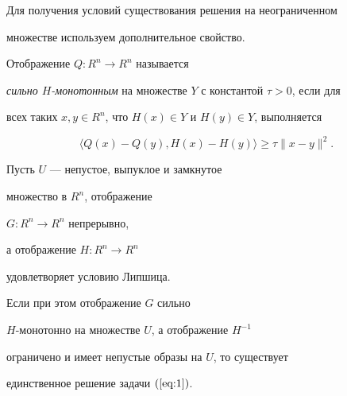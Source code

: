Для получения условий существования решения на неограниченном 


множестве используем дополнительное свойство. 





\begin{defn}


Отображение $Q: R^{n} \rightarrow R^{n}$ называется


{\it сильно $H$-монотонным} на множестве $Y$ с константой $\tau > 0$, если для


всех таких $x,y \in R^{n}$, что $H(x) \in Y$ и $H(y) \in Y$, выполняется


$$


\langle Q(x) - Q(y), H(x) - H(y) \rangle \geq \tau \| x-y \|^{2}.


$$


\end{defn}





 


\begin{prop}\label{pro:3}


Пусть $U$ --- непустое, выпуклое и замкнутое 


множество в $R^{n} $, отображение


$G: R^{n} \rightarrow R^{n}$ непрерывно,


а отображение $H: R^{n} \rightarrow R^{n} $


удовлетворяет условию Липшица. 


Если при этом отображение $G$ сильно


$H$-монотонно на множестве $U$, а отображение $H^{-1}$


ограничено и имеет непустые образы на $U$, то существует 


единственное решение задачи $(\ref{eq:1})$. 


\end{prop}





